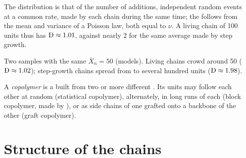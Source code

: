 \admitted

The distribution is that of the number of additions, independent random events at a common rate, made
by each chain during the same time; the  follows from the mean and variance of a Poisson law,
both equal to $\nu$. A living chain of 100 units thus has $\text{\DH} \approx 1.01$, against nearly 2 for
the same average made by step growth.

\begin{omfigure}

{\small Two samples with the same $\bar X_n = 50$ (models). Living chains crowd around 50 ($\text{\DH}
\approx 1.02$); step-growth chains spread from  to several hundred units ($\text{\DH} \approx
1.98$).}
\end{omfigure}

\begin{definition}[Copolymer]\label{def:b2:polymer-synthesis:copolymer}
A \emph{copolymer} is a  built from two or more different . Its units
may follow each other at random (statistical copolymer), alternately, in long runs of each (block
copolymer, made by ), or as side chains of one grafted onto a backbone of the other
(graft copolymer).
\end{definition}

\section{Structure of the chains}

